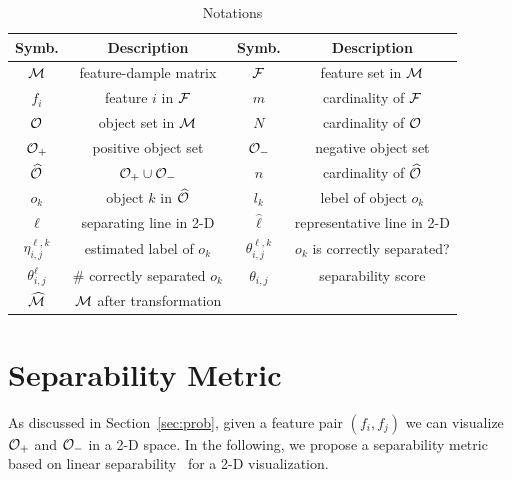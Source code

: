 \begin{table}[t!]
\vspace{-10pt}
\centering
\small
\begin{tabular}{c|c|c|c}
   Symb. & Description & Symb. & Description\\
    \hline
    \hline
    $\mm$ & feature-dample matrix & $\ff$ & feature set in $\mm$ \\
    \hline
    $f_i$ & feature $i$ in $\ff$ & $m$ & cardinality of $\ff$\\
    \hline
    $\oo$ & object set in $\mm$ & $N$ & cardinality of $\oo$\\
    \hline
    $\oo_+$ & positive object set & $\oo_-$ & negative object set\\
    \hline
    $\widehat{\oo}$ & $\oo_+\cup \oo_-$ & $n$ & cardinality of $\widehat{\oo}$\\
    \hline
    $o_k$ & object $k$ in $\widehat{\oo}$ & $l_k$ & lebel of object $o_k$\\
    \hline
    $\ell$ & separating line in 2-D & $\hat{\ell}$ & representative line  in 2-D\\
    \hline
    $\eta_{i,j}^{\ell,k}$ & estimated label of $o_k$ & $\theta_{i,j}^{\ell,k}$ & $o_k$ is correctly separated? \\
    \hline
    $\theta_{i,j}^{\ell}$ & \# correctly separated $o_k$ & $\theta_{i,j}$ & separability score\\
    \hline
    $\widehat{\mm}$ & $\mm$ after transformation &  \\
    \hline
 \end{tabular}
\vspace{-6pt}
\caption{Notations}
\label{tbl:notation}
\vspace{-18pt}
\end{table}

\section{Separability Metric}\label{sec:metric}

As discussed in Section~\ref{sec:prob}, given a feature pair $(f_i,f_j)$ we can visualize $\oo_+$ and $\oo_-$ in a 2-D space. In the following, we propose a separability metric based on linear separability~\cite{shamos1975geometric} for a 2-D visualization. 


